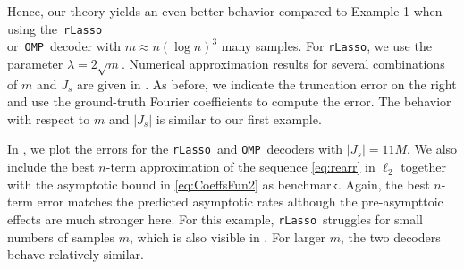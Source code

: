 \documentclass[11pt,reqno, a4paper]{article}
\numberwithin{equation}{section}
\newcommand{\rlasso}{\texttt{rLasso}}
\newcommand{\omp}{\texttt{OMP}}
\begin{document}
Hence, our theory yields an even better behavior compared to Example 1 when using the~\rlasso\\ or~\omp~decoder with $m\approx n(\log n)^3$ many samples.
For \rlasso, we use the parameter $\lambda = 2\sqrt{m}$.
Numerical approximation results for several combinations of $m$ and $J_s$ are given in .
As before, we indicate the truncation error on the right and use the ground-truth Fourier coefficients to compute the error.
The behavior with respect to $m$ and $\vert J_s \vert$ is similar to our first example.

In , we plot the errors for the \rlasso \ and \omp \ decoders with $\vert J_s \vert = 11M$.
We also include the best $n$-term approximation of the sequence \eqref{eq:rearr} in $\ell_2$ together with the asymptotic bound in \eqref{eq:CoeffsFun2} as benchmark.
Again, the best $n$-term error matches the predicted asymptotic rates although the pre-asympttoic effects are much stronger here.
For this example, \rlasso \ struggles for small numbers of samples $m$, which is also visible in .
For larger $m$, the two decoders behave relatively similar.
\end{document}
